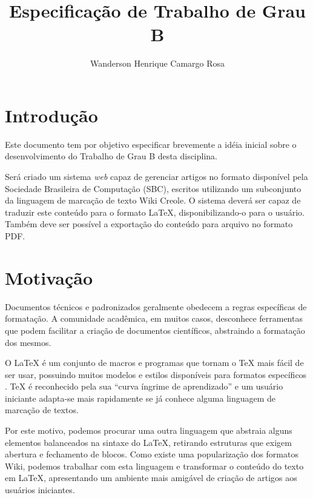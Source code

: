 \documentclass{article}
\title{Especificação de Trabalho de Grau B}
\author{Wanderson Henrique Camargo Rosa\inst{1}}
\begin{document}
\maketitle{}

\section{Introdução}
\label{sec:introducao}

Este documento tem por objetivo especificar brevemente a idéia inicial sobre o
desenvolvimento do Trabalho de Grau B desta disciplina.

Será criado um sistema \textit{web} capaz de gerenciar artigos no formato
disponível pela Sociedade Brasileira de Computação (SBC), escritos utilizando um
subconjunto da linguagem de marcação de texto Wiki Creole. O sistema deverá ser
capaz de traduzir este conteúdo para o formato \LaTeX{}, disponibilizando-o para
o usuário. Também deve ser possível a exportação do conteúdo para arquivo no
formato PDF.

\section{Motivação}
\label{sec:motivacao}

Documentos técnicos e padronizados geralmente obedecem a regras específicas de
formatação. A comunidade acadêmica, em muitos casos, desconhece ferramentas que
podem facilitar a criação de documentos científicos, abstraindo a formatação dos
mesmos.

O \LaTeX{} é um conjunto de macros e programas que tornam o \TeX{} mais fácil de
ser usar, possuindo muitos modelos e estilos disponíveis para formatos
específicos \cite{p241-salzberg}. \TeX{} é reconhecido pela sua ``curva íngrime
de aprendizado'' e um usuário iniciante adapta-se mais rapidamente se já conhece
alguma linguagem de marcação de textos.

Por este motivo, podemos procurar uma outra linguagem que abstraia alguns
elementos balanceados na sintaxe do \LaTeX{}, retirando estruturas que exigem
abertura e fechamento de blocos. Como existe uma popularização dos formatos
Wiki, podemos trabalhar com esta linguagem e transformar o conteúdo do texto em
\LaTeX{}, apresentando um ambiente mais amigável de criação de artigos aos
usuários iniciantes.
\end{document}
